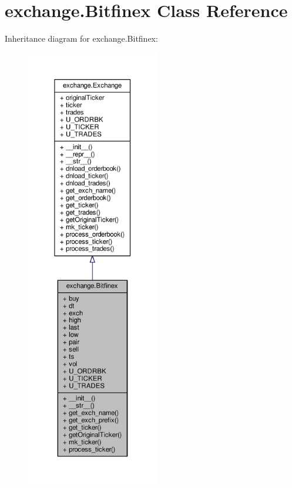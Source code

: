 \hypertarget{classexchange_1_1_bitfinex}{}\section{exchange.\+Bitfinex Class Reference}
\label{classexchange_1_1_bitfinex}


Inheritance diagram for exchange.\+Bitfinex\+:\nopagebreak
\begin{figure}[H]
\begin{center}
\leavevmode
\includegraphics[height=550pt]{classexchange_1_1_bitfinex__inherit__graph}
\end{center}
\end{figure}


